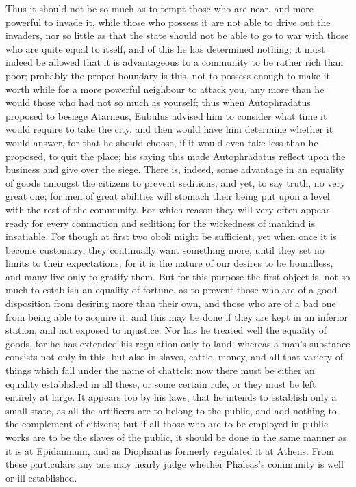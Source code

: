 Thus it should not be so much as to tempt those who are near, and more
powerful to invade it, while those who possess it are not able to drive
out the invaders, nor so little as that the state should not be able to go
to war with those who are quite equal to itself, and of this he has
determined nothing; it must indeed be allowed that it is advantageous to a
community to be rather rich than poor; probably the proper boundary is
this, not to possess enough to make it worth while for a more powerful
neighbour to attack you, any more than he would those who had not so much
as yourself; thus when Autophradatus proposed to besiege Atarneus, Eubulus
advised him to consider what time it would require to take the city, and
then would have him determine whether it would answer, for that he should
choose, if it would even take less than he proposed, to quit the place;
his saying this made Autophradatus reflect upon the business and give over
the siege. There is, indeed, some advantage in an equality of goods
amongst the citizens to prevent seditions; and yet, to say truth, no very
great one; for men of great abilities will stomach their being put upon a
level with the rest of the community. For which reason they will very
often appear ready for every commotion and sedition; for the wickedness of
mankind is insatiable. For though at first two oboli might be sufficient,
yet when once it is become customary, they continually want something
more, until they set no limits to their expectations; for it is the nature
of our desires to be boundless, and many live only to gratify them. But
for this purpose the first object is, not so much to establish an equality
of fortune, as to prevent those who are of a good disposition from
desiring more than their own, and those who are of a bad one from being
able to acquire it; and this may be done if they are kept in an inferior
station, and not exposed to injustice. Nor has he treated well the
equality of goods, for he has extended his regulation only to land;
whereas a man's substance consists not only in this, but also in slaves,
cattle, money, and all that variety of things which fall under the name of
chattels; now there must be either an equality established in all these,
or some certain rule, or they must be left entirely at large. It appears
too by his laws, that he intends to establish only a small state, as all
the artificers are to belong to the public, and add nothing to the
complement of citizens; but if all those who are to be employed in public
works are to be the slaves of the public, it should be done in the same
manner as it is at Epidamnum, and as Diophantus formerly regulated it at
Athens. From these particulars any one may nearly judge whether Phaleas's
community is well or ill established.

